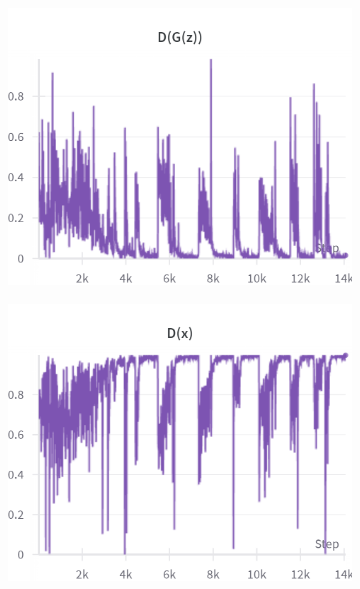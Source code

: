 \begin{figure}[H]
    \begin{subfigure}{0.45\textwidth}
        \centering
        \includegraphics[width=0.95\linewidth]{longer_epochs/D_G_z.png}
        \caption{}
        \label{subfig:longer_epochs/D_G_z}
    \end{subfigure}%
    \begin{subfigure}{0.45\textwidth}
        \centering
        \includegraphics[width=0.95\linewidth]{longer_epochs/D_x.png}
        \caption{}
        \label{subfig:longer_epochs/D_x}
    \end{subfigure}


\end{figure}
